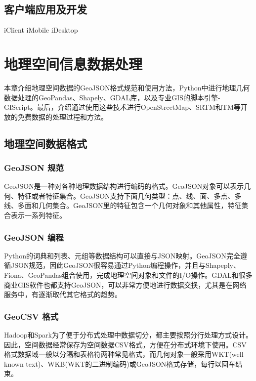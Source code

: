 \documentclass[letterpaper,10pt,english]{sphinxmanual}
\begin{document}
\subsection{客户端应用及开发}
\label{gispark_saas:_u5ba2_u6237_u7aef_u5e94_u7528_u53ca_u5f00_u53d1}
iClient iMobile iDesktop


\section{地理空间信息数据处理}
\label{gispark_process:_u5730_u7406_u7a7a_u95f4_u4fe1_u606f_u6570_u636e_u5904_u7406}\label{gispark_process::doc}
本章介绍地理空间数据的GeoJSON格式规范和使用方法，Python中进行地理几何数据处理的GeoPandas、Shapely、GDAL库，以及专业GIS的脚本引擎-GIScript。最后，介绍通过使用这些技术进行OpenStreetMap、SRTM和TM等开放的免费数据的处理过程和方法。


\subsection{地理空间数据格式}
\label{gispark_process:_u5730_u7406_u7a7a_u95f4_u6570_u636e_u683c_u5f0f}

\subsubsection{GeoJSON 规范}
\label{gispark_process:GeoJSON-_u89c4_u8303}
GeoJSON是一种对各种地理数据结构进行编码的格式。GeoJSON对象可以表示几何、特征或者特征集合。GeoJSON支持下面几何类型：点、线、面、多点、多线、多面和几何集合。GeoJSON里的特征包含一个几何对象和其他属性，特征集合表示一系列特征。


\subsubsection{GeoJSON 编程}
\label{gispark_process:GeoJSON-_u7f16_u7a0b}
Python的词典和列表、元组等数据结构可以直接与JSON映射。GeoJSON完全遵循JSON规范，因此GeoJSON很容易通过Python编程操作，并且与Shapeply、Fiona、GeoPandas组合使用，完成地理空间对象和文件的I/O操作。GDAL和很多商业GIS软件也都支持GeoJSON，可以非常方便地进行数据交换，尤其是在网络服务中，有逐渐取代其它格式的趋势。


\subsubsection{GeoCSV 格式}
\label{gispark_process:GeoCSV-_u683c_u5f0f}
Hadoop和Spark为了便于分布式处理中数据切分，都主要按照分行处理方式设计。因此，空间数据经常保存为空间数据CSV格式，方便在分布式环境下使用。CSV格式数据域一般以分隔和表格符两种常见格式，而几何对象一般采用WKT(well
known
text)、WKB(WKT的二进制编码)或GeoJSON格式存储，每行以回车结束。
\end{document}
